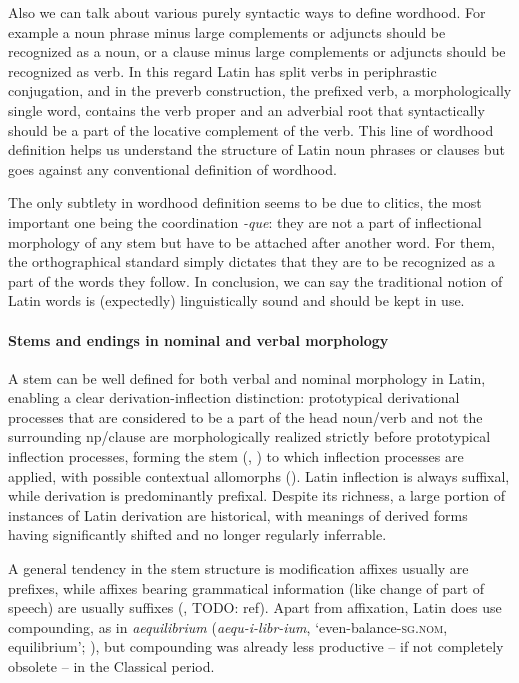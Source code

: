 \documentclass[a4paper, oneside, 12pt]{report}
\newcommand*{\citesec}[1]{\S~{#1}}
\newcommand{\form}[1]{\emph{#1}}
\newcommand*{\category}[1]{\textsc{#1}}
\newcommand{\translate}[1]{`#1'}
\begin{document}
Also we can talk about various purely syntactic ways to define wordhood.
For example a noun phrase minus large complements or adjuncts should be recognized as a noun,
or a clause minus large complements or adjuncts should be recognized as verb.
In this regard Latin has split verbs in periphrastic conjugation,
and in the preverb construction, 
the prefixed verb, a morphologically single word, 
contains the verb proper and an adverbial root that 
syntactically should be a part of the locative complement of the verb. 
This line of wordhood definition helps us understand the structure of Latin noun phrases or clauses 
but goes against any conventional definition of wordhood.

The only subtlety in wordhood definition seems to be due to clitics, 
the most important one being the coordination \form{-que}: 
they are not a part of inflectional morphology of any stem 
but have to be attached after another word.
For them, the orthographical standard simply dictates that 
they are to be recognized as a part of the words they follow. 
In conclusion, we can say the traditional notion of Latin words 
is (expectedly) linguistically sound 
and should be kept in use.

\paragraph*{Stems and endings in nominal and verbal morphology}

A stem can be well defined for both verbal and nominal morphology in Latin,
enabling a clear derivation-inflection distinction:
prototypical derivational processes that are considered 
to be a part of the head noun/verb 
and not the surrounding \acs{np}/clause
are morphologically realized strictly 
before prototypical inflection processes,
forming the stem 
(,
) to which 
inflection processes are applied,
with possible contextual allomorphs
(). 
Latin inflection is always suffixal,
while derivation is predominantly prefixal.
Despite its richness, 
a large portion of instances of Latin derivation are historical,
with meanings of derived forms 
having significantly shifted and no longer regularly inferrable.

A general tendency in the stem structure 
is modification affixes usually are prefixes,
while affixes bearing grammatical information 
(like change of part of speech) 
are usually suffixes
(, TODO: ref).
Apart from affixation,
Latin does use compounding, as in \form{aequilibrium} 
(\form{aequ-i-libr-ium}, \translate{even-balance-\category{sg.nom}, equilibrium};
\citealt[\citesec{92}]{smith2016greek}),
but compounding was already less productive -- if not completely obsolete --
in the Classical period.
\end{document}
